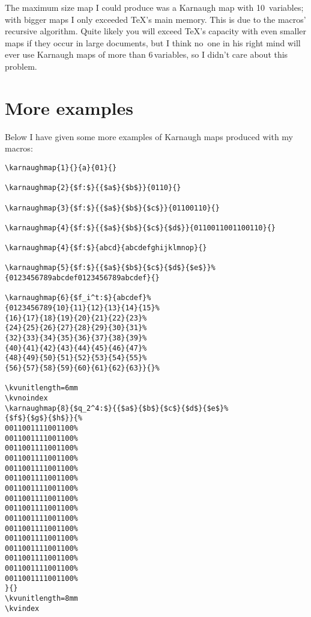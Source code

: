 \documentclass{article}
\begin{document}
The maximum size map I could produce was a Karnaugh map with 10~variables;
with bigger maps I only exceeded \TeX's main memory. This is due to the
macros' recursive algorithm. Quite likely you will exceed \TeX's capacity with
even smaller maps if they occur in large documents, but I think no~one in his
right mind will ever use Karnaugh maps of more than 6\,variables, so I didn't
care about this problem.


\section{More examples}

Below I have given some more examples of Karnaugh maps produced with my
macros:  

\begin{verbatim}
\karnaughmap{1}{}{a}{01}{}
  
\karnaughmap{2}{$f:$}{{$a$}{$b$}}{0110}{}
  
\karnaughmap{3}{$f:$}{{$a$}{$b$}{$c$}}{01100110}{}
  
\karnaughmap{4}{$f:$}{{$a$}{$b$}{$c$}{$d$}}{0110011001100110}{}
  
\karnaughmap{4}{$f:$}{abcd}{abcdefghijklmnop}{}

\karnaughmap{5}{$f:$}{{$a$}{$b$}{$c$}{$d$}{$e$}}%
{0123456789abcdef0123456789abcdef}{}

\karnaughmap{6}{$f_i^t:$}{abcdef}%
{0123456789{10}{11}{12}{13}{14}{15}%
{16}{17}{18}{19}{20}{21}{22}{23}%
{24}{25}{26}{27}{28}{29}{30}{31}%
{32}{33}{34}{35}{36}{37}{38}{39}%
{40}{41}{42}{43}{44}{45}{46}{47}%
{48}{49}{50}{51}{52}{53}{54}{55}%
{56}{57}{58}{59}{60}{61}{62}{63}}{}%

\kvunitlength=6mm
\kvnoindex
\karnaughmap{8}{$q_2^4:$}{{$a$}{$b$}{$c$}{$d$}{$e$}%
{$f$}{$g$}{$h$}}{%
0011001111001100%
0011001111001100%
0011001111001100%
0011001111001100%
0011001111001100%
0011001111001100%
0011001111001100%
0011001111001100%
0011001111001100%
0011001111001100%
0011001111001100%
0011001111001100%
0011001111001100%
0011001111001100%
0011001111001100%
0011001111001100%
}{}
\kvunitlength=8mm
\kvindex
\end{verbatim}
\end{document}
